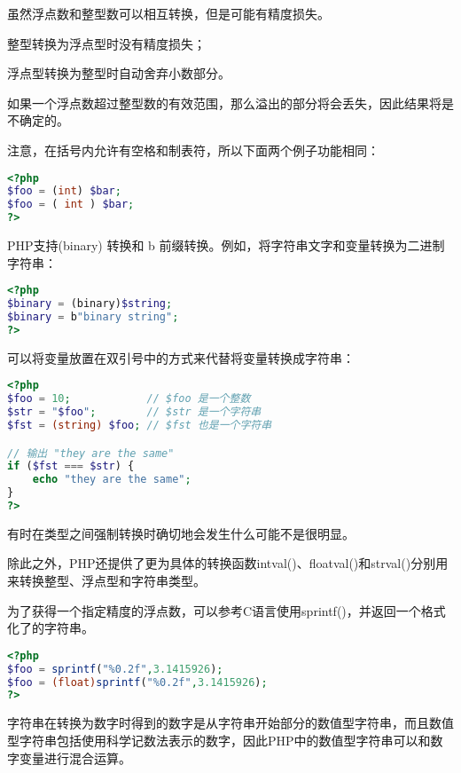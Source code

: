 虽然浮点数和整型数可以相互转换，但是可能有精度损失。

\begin{compactitem}
\item 整型转换为浮点型时没有精度损失；
\item 浮点型转换为整型时自动舍弃小数部分。
\end{compactitem}

如果一个浮点数超过整型数的有效范围，那么溢出的部分将会丢失，因此结果将是不确定的。

注意，在括号内允许有空格和制表符，所以下面两个例子功能相同：



\begin{lstlisting}[language=PHP]
<?php
$foo = (int) $bar;
$foo = ( int ) $bar;
?>
\end{lstlisting}

PHP支持(binary) 转换和 b 前缀转换。例如，将字符串文字和变量转换为二进制字符串：


\begin{lstlisting}[language=PHP]
<?php
$binary = (binary)$string;
$binary = b"binary string";
?>
\end{lstlisting}

可以将变量放置在双引号中的方式来代替将变量转换成字符串：


\begin{lstlisting}[language=PHP]
<?php
$foo = 10;            // $foo 是一个整数
$str = "$foo";        // $str 是一个字符串
$fst = (string) $foo; // $fst 也是一个字符串

// 输出 "they are the same"
if ($fst === $str) {
    echo "they are the same";
}
?>
\end{lstlisting}

有时在类型之间强制转换时确切地会发生什么可能不是很明显。

除此之外，PHP还提供了更为具体的转换函数intval()、floatval()和strval()分别用来转换整型、浮点型和字符串类型。

为了获得一个指定精度的浮点数，可以参考C语言使用sprintf()，并返回一个格式化了的字符串。

\begin{lstlisting}[language=PHP]
<?php
$foo = sprintf("%0.2f",3.1415926);
$foo = (float)sprintf("%0.2f",3.1415926);
?>
\end{lstlisting}

字符串在转换为数字时得到的数字是从字符串开始部分的数值型字符串，而且数值型字符串包括使用科学记数法表示的数字，因此PHP中的数值型字符串可以和数字变量进行混合运算。


